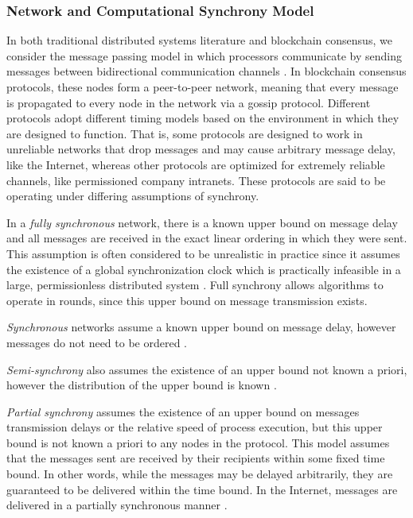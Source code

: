 \documentclass[10pt,journal,compsoc]{IEEEtran}
\begin{document}
\subsubsection{Network and Computational Synchrony Model}
In both traditional distributed systems literature and blockchain consensus, we consider the message passing model in which processors communicate by sending messages between bidirectional communication channels \cite{AttiyaWelch}. In blockchain consensus protocols, these nodes form a peer-to-peer network, meaning that every message is propagated to every node in the network via a gossip protocol. Different protocols adopt different timing models based on the environment in which they are designed to function. That is, some protocols are designed to work in unreliable networks that drop messages and may cause arbitrary message delay, like the Internet, whereas other protocols are optimized for extremely reliable channels, like permissioned company intranets. These protocols are said to be operating under differing assumptions of synchrony.  


In a \emph{fully synchronous} network, there is a known upper bound on message delay and all messages are received in the exact linear ordering in which they were sent. This assumption is often considered to be unrealistic in practice since it assumes the existence of a global synchronization clock which is practically infeasible in a large, permissionless distributed system \cite{Mahnush}. Full synchrony allows algorithms to operate in rounds, since this upper bound on message transmission exists. 

\emph{Synchronous} networks assume a known upper bound on message delay, however messages do not need to be ordered \cite{Mahnush}.

\emph{Semi-synchrony} also assumes the existence of an upper bound not known a priori, however the distribution of the upper bound is known \cite{Attiya&Lynch}.

\emph{Partial synchrony} assumes the existence of an upper bound on messages transmission delays or the relative speed of process execution, but this upper bound is not known a priori to any nodes in the protocol. This model assumes that the messages sent are received by their recipients within some fixed time bound. In other words, while the messages may be delayed arbitrarily, they are guaranteed to be delivered within the time bound. In the Internet, messages are delivered in a partially synchronous manner \cite{Mahnush}.
\end{document}
